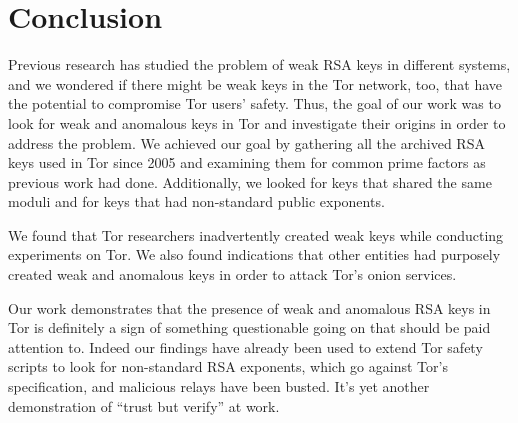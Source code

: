 \section{Conclusion}
\label{sec:conclusion}

Previous research has studied the problem of weak RSA keys in different 
systems, and we wondered if there might be weak keys in the Tor 
network, too, that have the potential to compromise Tor users' safety.  
Thus, the goal of our work was to look for weak and anomalous keys in Tor 
and investigate their origins in order to address the problem.  We 
achieved our goal by gathering all the archived RSA keys used in Tor since 
2005 and examining them for common prime factors as previous work had done.  
Additionally, we looked for keys that shared the same moduli and 
for keys that had non-standard public exponents.

We found that Tor researchers inadvertently created weak keys while 
conducting experiments on Tor.  We also found indications that other 
entities had purposely created weak and anomalous keys in order to 
attack Tor's onion services.  

Our work demonstrates that the presence of weak and anomalous RSA keys in 
Tor is definitely a sign of something questionable going on that should 
be paid attention to.  Indeed our findings have already been used to 
extend Tor safety scripts to look for non-standard RSA exponents, 
which go against Tor's specification, and malicious relays have been busted.  
It's yet another demonstration of ``trust but verify'' at work.
